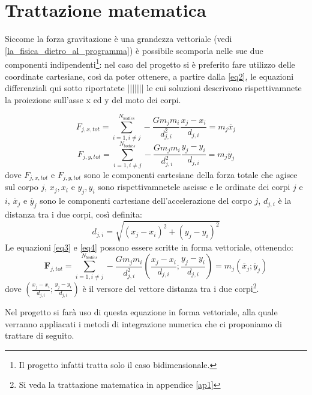 \documentclass{article}
\begin{document}
\section{Trattazione matematica}
Siccome la forza gravitazione è una grandezza vettoriale (vedi \ref{la_fisica_dietro_al_programma}) è possibile scomporla nelle sue due componenti indipendenti\footnote{Il progetto infatti tratta solo il caso bidimensionale.}: nel caso del progetto si è preferito fare utilizzo delle coordinate cartesiane, così da poter ottenere, a partire dalla \ref{eq2}, le equazioni differenziali qui sotto riportatete ||||||| le cui soluzioni descrivono rispettivamnete la proiezione sull'asse x ed y del moto dei corpi.

\begin{equation}
    F_{j,x,tot}=\sum_{i=1,i\neq j}^{N_{bodies}}-\frac{Gm_{j}m_{i}}{d_{j,i}^2}\frac{x_{j}-x_{i}}{d_{j,i}}=m_{j}\ddot{x_{j}}
    \label{eq3}
\end{equation}
\begin{equation}
    F_{j,y,tot}=\sum_{i=1,i\neq j}^{N_{bodies}}-\frac{Gm_{j}m_{i}}{d_{j,i}^2}\frac{y_{j}-y_{i}}{d_{j,i}}=m_{j}\ddot{y_{j}}
\label{eq4}
\end{equation}
dove $F_{j,x,tot}$ e $F_{j,y,tot}$ sono le componenti cartesiane della forza totale che agisce sul corpo $j$, $x_{j}, x_{i}$ e $y_{j}, y_{i}$ sono rispettivamnetele ascisse e le ordinate dei corpi $j$ e $i$, $\ddot{x_{j}}$ e $\ddot{y_{j}}$ sono le componenti cartesiane dell'accelerazione del corpo $j$, $d_{j,i}$ è la distanza tra i due corpi, così definita:
\begin{equation}
    d_{j,i}=\sqrt{(x_{j}-x_{i})^2+(y_{j}-y_{i})^2}
\end{equation}
Le equazioni \ref{eq3} e \ref{eq4} possono essere scritte in forma vettoriale, ottenendo:
\begin{equation}
    \textbf{F}_{j,tot}=\sum_{i=1,i\neq j}^{N_{bodies}}-\frac{Gm_{j}m_{i}}{d_{j,i}^2}(\frac{x_{j}-x_{i}}{d_{j,i}}; \frac{y_{j}-y_{i}}{d_{j,i}})=m_{j}(\ddot{x_{j}}; \ddot{y_{j}})
\label{eq5}
\end{equation}
dove $(\frac{x_{j}-x_{i}}{d_{j,i}}; \frac{y_{j}-y_{i}}{d_{j,i}})$ è il versore del vettore distanza tra i due corpi\footnote{Si veda la trattazione matematica in appendice \ref{ap1}}.

Nel progetto si farà uso di questa equazione in forma vettoriale, alla quale verranno appliacati i metodi di integrazione numerica che ci proponiamo di trattare di seguito.
\end{document}
